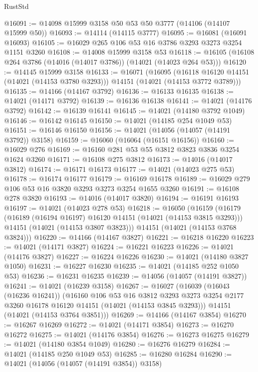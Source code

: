 \begin{lexlean}{RustStd}
\begin{coremodule}
@16091 := @14098 @15999 @3158 @50 @53 @50 @3777 (@14106 (@14107 @15999 @50))
@16093 := @14114 (@14115 @3777)
@16095 := @16081 (@16091 @16093)
@16105 := @16029 @265 @106 @53 @16 @3786 @3293 @3273 @3254 @1151 @3260
@16108 := @14008 @15999 @3158 @53
@16118 := @16105 (@16108 @264 @3786 (@14016 (@14017 @3786)) (@14021 (@14023 @264 @53)))
@16120 := @14145 @15999 @3158
@16133 := @16071
    (@16095
      (@16118 @16120 @14151 (@14021 (@14153 @3780 @3293)))
      @14151
      (@14021 (@14153 @3772 @3789)))
@16135 := @14166 (@14167 @3792)
@16136 := @16133 @16135
@16138 := @14021 (@14171 @3792)
@16139 := @16136 @16138
@16141 := @14021 (@14176 @3792)
@16142 := @16139 @16141
@16145 := @14021 (@14180 @3792 @1049)
@16146 := @16142 @16145
@16150 := @14021 (@14185 @254 @1049 @53)
@16151 := @16146 @16150
@16156 := @14021 (@14056 (@14057 (@14191 @3792)) @3158)
@16159 := @16060 (@16064 (@16151 @16156))
@16160 := @16029 @276
@16169 := @16160 @281 @53 @55 @3812 @3823 @3836 @3254 @1624 @3260
@16171 := @16108 @275 @3812
@16173 := @14016 (@14017 @3812)
@16174 := @16171 @16173
@16177 := @14021 (@14023 @275 @53)
@16178 := @16174 @16177
@16179 := @16169 @16178
@16189 := @16029 @279 @106 @53 @16 @3820 @3293 @3273 @3254 @1655 @3260
@16191 := @16108 @278 @3820
@16193 := @14016 (@14017 @3820)
@16194 := @16191 @16193
@16197 := @14021 (@14023 @278 @53)
@16218 := @16050
    (@16159
      (@16179
        (@16189 (@16194 @16197) @16120 @14151 (@14021 (@14153 @3815 @3293)))
        @14151
        (@14021 (@14153 @3807 @3823)))
      @14151
      (@14021 (@14153 @3768 @3824)))
@16220 := @14166 (@14167 @3827)
@16221 := @16218 @16220
@16223 := @14021 (@14171 @3827)
@16224 := @16221 @16223
@16226 := @14021 (@14176 @3827)
@16227 := @16224 @16226
@16230 := @14021 (@14180 @3827 @1050)
@16231 := @16227 @16230
@16235 := @14021 (@14185 @252 @1050 @53)
@16236 := @16231 @16235
@16239 := @14056 (@14057 (@14191 @3827))
@16241 := @14021 (@16239 @3158)
@16267 := @16027
    (@16039
      (@16043 (@16236 @16241))
      (@16160
        @106
        @53
        @16
        @3812
        @3293
        @3273
        @3254
        @2177
        @3260
        @16178
        @16120
        @14151
        (@14021 (@14153 @3845 @3293)))
      @14151
      (@14021 (@14153 @3764 @3851)))
@16269 := @14166 (@14167 @3854)
@16270 := @16267 @16269
@16272 := @14021 (@14171 @3854)
@16273 := @16270 @16272
@16275 := @14021 (@14176 @3854)
@16276 := @16273 @16275
@16279 := @14021 (@14180 @3854 @1049)
@16280 := @16276 @16279
@16284 := @14021 (@14185 @250 @1049 @53)
@16285 := @16280 @16284
@16290 := @14021 (@14056 (@14057 (@14191 @3854)) @3158)

\end{coremodule}
\end{lexlean}
